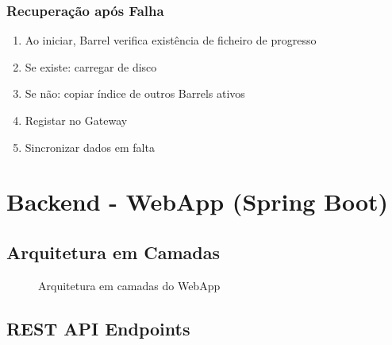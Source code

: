 \documentclass[12pt,a4paper]{article}
\begin{document}
\subsubsection{Recuperação após Falha}
\begin{enumerate}
    \item Ao iniciar, Barrel verifica existência de ficheiro de progresso
    \item Se existe: carregar de disco
    \item Se não: copiar índice de outros Barrels ativos
    \item Registar no Gateway
    \item Sincronizar dados em falta
\end{enumerate}

\newpage

\section{Backend - WebApp (Spring Boot)}

\subsection{Arquitetura em Camadas}

\begin{figure}[H]
\centering
{}
\caption{Arquitetura em camadas do WebApp}
\end{figure}

\subsection{REST API Endpoints}
\end{document}
